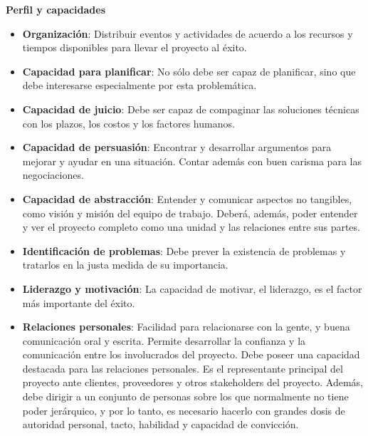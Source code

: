 \textbf{       Perfil y capacidades}
            \begin{itemize}
                \item \textbf{Organización}:
                Distribuir eventos y actividades de acuerdo a los recursos y tiempos disponibles para llevar el proyecto al éxito.
                
                \item \textbf{Capacidad para planificar}:
                No sólo debe ser capaz de planificar, sino que debe interesarse especialmente por esta problemática.
                
                \item \textbf{Capacidad de juicio}:
                Debe ser capaz de compaginar las soluciones técnicas con los plazos, los costos y los factores humanos.
                
                \item \textbf{Capacidad de persuasión}:
                Encontrar y desarrollar argumentos para mejorar y ayudar en una situación.
                Contar además con buen carisma para las negociaciones.
                
                \item \textbf{Capacidad de abstracción}:
                Entender y comunicar aspectos no tangibles, como visión y misión del equipo de trabajo.
                Deberá, además, poder entender y ver el proyecto completo como una unidad y las relaciones entre sus partes.
                
                \item \textbf{Identificación de problemas}:
                Debe prever la existencia de problemas y tratarlos en la justa medida de su importancia.
                
                \item \textbf{Liderazgo y motivación}:
                La capacidad de motivar, el liderazgo, es el factor más importante del éxito.
                
                \item \textbf{Relaciones personales}:
                Facilidad para relacionarse con la gente, y buena comunicación oral y escrita.
                Permite desarrollar la confianza y la comunicación entre los involucrados del proyecto.
                Debe poseer una capacidad destacada para las relaciones personales.
                Es el representante principal del proyecto ante clientes, proveedores y otros stakeholders del proyecto.
                Además, debe dirigir a un conjunto de personas sobre los que normalmente no tiene poder jerárquico, y por lo tanto, es necesario hacerlo con grandes dosis de autoridad personal, tacto, habilidad y capacidad de convicción.
                

\end{itemize}
